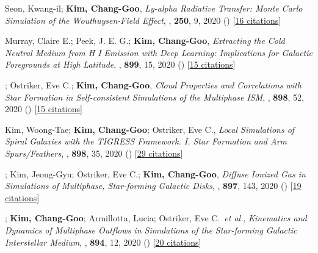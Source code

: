 \item[{24.}]Seon, Kwang-il; \textbf{Kim, Chang-Goo}, \textit{Ly-alpha Radiative Transfer: Monte Carlo Simulation of the Wouthuysen-Field Effect}, , \textbf{250}, 9, 2020 () [\href{http://adsabs.harvard.edu/abs/2020ApJS..250....9S}{16 citations}]

\item[{23.}]Murray, Claire E.; Peek, J. E. G.; \textbf{Kim, Chang-Goo}, \textit{Extracting the Cold Neutral Medium from H I Emission with Deep Learning: Implications for Galactic Foregrounds at High Latitude}, , \textbf{899}, 15, 2020 () [\href{http://adsabs.harvard.edu/abs/2020ApJ...899...15M}{15 citations}]

\item[{22.}]; Ostriker, Eve C.; \textbf{Kim, Chang-Goo}, \textit{Cloud Properties and Correlations with Star Formation in Self-consistent Simulations of the Multiphase ISM}, , \textbf{898}, 52, 2020 () [\href{http://adsabs.harvard.edu/abs/2020ApJ...898...52M}{15 citations}]

\item[{21.}]Kim, Woong-Tae; \textbf{Kim, Chang-Goo}; Ostriker, Eve C., \textit{Local Simulations of Spiral Galaxies with the TIGRESS Framework. I. Star Formation and Arm Spurs/Feathers}, , \textbf{898}, 35, 2020 () [\href{http://adsabs.harvard.edu/abs/2020ApJ...898...35K}{29 citations}]

\item[{20.}]; Kim, Jeong-Gyu; Ostriker, Eve C.; \textbf{Kim, Chang-Goo}, \textit{Diffuse Ionized Gas in Simulations of Multiphase, Star-forming Galactic Disks}, , \textbf{897}, 143, 2020 () [\href{http://adsabs.harvard.edu/abs/2020ApJ...897..143K}{19 citations}]

\item[{19.}]; \textbf{Kim, Chang-Goo}; Armillotta, Lucia; Ostriker, Eve C.~\textit{et al.}, \textit{Kinematics and Dynamics of Multiphase Outflows in Simulations of the Star-forming Galactic Interstellar Medium}, , \textbf{894}, 12, 2020 () [\href{http://adsabs.harvard.edu/abs/2020ApJ...894...12V}{20 citations}]

